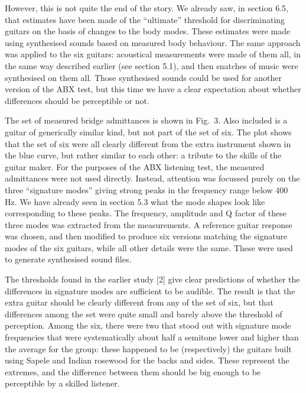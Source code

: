   However, this is not quite the end of the story. We already saw, in section 
  6.5, that estimates have been made of the “ultimate” threshold for 
  discriminating guitars on the basis of changes to the body modes. These 
  estimates were made using synthesised sounds based on measured body 
  behaviour. The same approach was applied to the six guitars: acoustical 
  measurements were made of them all, in the same way described earlier (see 
  section 5.1), and then snatches of music were synthesised on them all. Those 
  synthesised sounds could be used for another version of the ABX test, but 
  this time we have a clear expectation about whether differences should be 
  perceptible or not. 

  The set of measured bridge admittances is shown in Fig.\ 3. Also included is 
  a guitar of generically similar kind, but not part of the set of six. The 
  plot shows that the set of six were all clearly different from the extra 
  instrument shown in the blue curve, but rather similar to each other: a 
  tribute to the skills of the guitar maker. For the purposes of the ABX 
  listening test, the measured admittances were not used directly. Instead, 
  attention was focussed purely on the three “signature modes” giving strong 
  peaks in the frequency range below 400 Hz. We have already seen in section 
  5.3 what the mode shapes look like corresponding to these peaks. The 
  frequency, amplitude and Q factor of these three modes was extracted from the 
  measurements. A reference guitar response was chosen, and then modified to 
  produce six versions matching the signature modes of the six guitars, while 
  all other details were the same. These were used to generate synthesised 
  sound files. 

  The thresholds found in the earlier study [2] give clear predictions of 
  whether the differences in signature modes are sufficient to be audible. The 
  result is that the extra guitar should be clearly different from any of the 
  set of six, but that differences among the set were quite small and barely 
  above the threshold of perception. Among the six, there were two that stood 
  out with signature mode frequencies that were systematically about half a 
  semitone lower and higher than the average for the group: these happened to 
  be (respectively) the guitars built using Sapele and Indian rosewood for the 
  backs and sides. These represent the extremes, and the difference between 
  them should be big enough to be perceptible by a skilled listener. 

